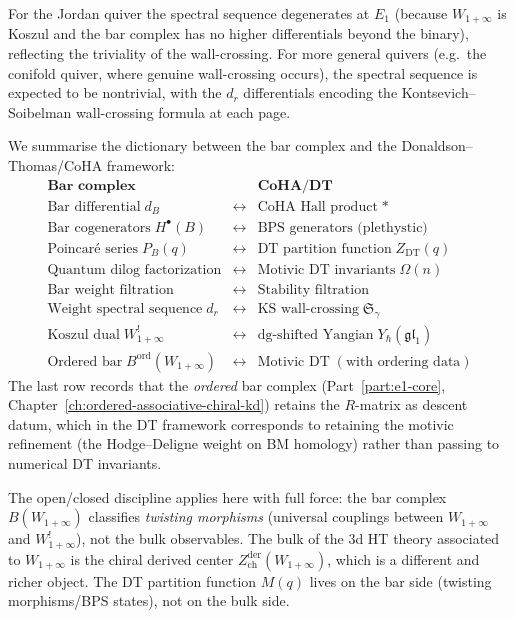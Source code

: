 \begin{conjecture}
For the Jordan quiver the spectral sequence degenerates at $E_1$
\textup{(}because $W_{1+\infty}$ is Koszul and the bar complex has no
higher differentials beyond the binary\textup{)}, reflecting the
triviality of the wall-crossing. For more general quivers
\textup{(}e.g.\ the conifold quiver, where genuine wall-crossing
occurs\textup{)}, the spectral sequence is expected to be nontrivial,
with the $d_r$ differentials encoding the Kontsevich--Soibelman
wall-crossing formula at each page.
\end{conjecture}

\begin{remark}
\label{rem:bar-dt-dictionary}
We summarise the dictionary between the bar complex and the
Donaldson--Thomas/CoHA framework:
\[
\renewcommand{\arraystretch}{1.4}
\begin{array}{lcl}
 \textbf{Bar complex} & & \textbf{CoHA/DT} \\
 \hline
 \text{Bar differential}\; d_B
 & \longleftrightarrow &
 \text{CoHA Hall product}\; * \\
 \text{Bar cogenerators}\; H^\bullet(B)
 & \longleftrightarrow &
 \text{BPS generators (plethystic)} \\
 \text{Poincar\'{e} series}\; P_B(q)
 & \longleftrightarrow &
 \text{DT partition function}\; Z_{\mathrm{DT}}(q) \\
 \text{Quantum dilog factorization}
 & \longleftrightarrow &
 \text{Motivic DT invariants}\; \Omega(n) \\
 \text{Bar weight filtration}
 & \longleftrightarrow &
 \text{Stability filtration} \\
 \text{Weight spectral sequence}\; d_r
 & \longleftrightarrow &
 \text{KS wall-crossing}\; \mathfrak{S}_\gamma \\
 \text{Koszul dual}\; W_{1+\infty}^!
 & \longleftrightarrow &
 \text{dg-shifted Yangian}\; Y_\hbar(\mathfrak{gl}_1) \\
 \text{Ordered bar}\; B^{\mathrm{ord}}(W_{1+\infty})
 & \longleftrightarrow &
 \text{Motivic DT}\; (\text{with ordering data})
\end{array}
\]
The last row records that the \emph{ordered} bar complex
(Part~\ref{part:e1-core}, Chapter~\textup{\ref{ch:ordered-associative-chiral-kd}})
retains the $R$-matrix as descent datum, which in the DT framework
corresponds to retaining the motivic refinement
\textup{(}the Hodge--Deligne weight on BM homology\textup{)}
rather than passing to numerical DT invariants.

The open/closed discipline applies here with full force: the bar complex
$B(W_{1+\infty})$ classifies \emph{twisting morphisms}
(universal couplings between $W_{1+\infty}$ and $W_{1+\infty}^!$),
not the bulk observables. The bulk of the 3d HT theory associated
to $W_{1+\infty}$ is the chiral derived center
$Z^{\mathrm{der}}_{\mathrm{ch}}(W_{1+\infty})$, which is a
different and richer object. The DT partition function $M(q)$
lives on the bar side (twisting morphisms/BPS states), not on the
bulk side.
\end{remark}

